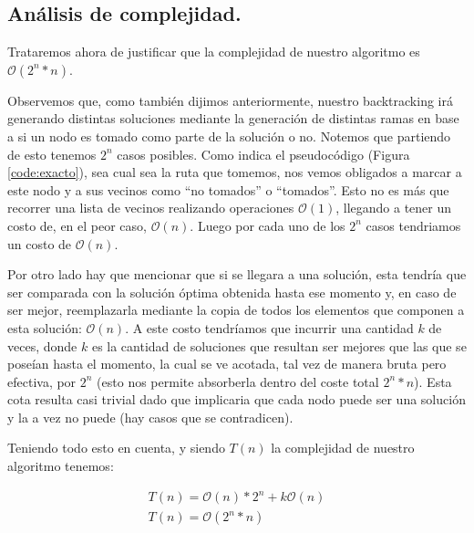 \vspace*{0.6cm}


\subsection{Análisis de complejidad.}

\vspace*{0.3cm}

Trataremos ahora de justificar que la complejidad de nuestro algoritmo es $\mathcal{O}(2^n * n)$.

Observemos que, como también dijimos anteriormente, nuestro backtracking irá generando distintas soluciones mediante la generación de distintas ramas en base a si un nodo es tomado como parte de la solución o no. Notemos que partiendo de esto tenemos $2^n$ casos posibles. Como indica el pseudocódigo (Figura \ref{code:exacto}), sea cual sea la ruta que tomemos, nos vemos obligados a marcar a este nodo y a sus vecinos como ``no tomados'' o ``tomados''. Esto no es más que recorrer una lista de vecinos realizando operaciones $\mathcal{O}(1)$, llegando a tener un costo de, en el peor caso, $\mathcal{O}(n)$. Luego por cada uno de los $2^n$ casos tendriamos un costo de $\mathcal{O}(n)$.

Por otro lado hay que mencionar que si se llegara a una solución, esta tendría que ser comparada con la solución óptima obtenida hasta ese momento y, en caso de ser mejor, reemplazarla mediante la copia de todos los elementos que componen a esta solución: $\mathcal{O}(n)$. A este costo tendríamos que incurrir una cantidad $k$ de veces, donde $k$ es la cantidad de soluciones que resultan ser mejores que las que se poseían hasta el momento, la cual se ve acotada, tal vez de manera bruta pero efectiva, por $2^n$ (esto nos permite absorberla dentro del coste total $2^n*n$). Esta cota resulta casi trivial dado que implicaria que cada nodo puede ser una solución y la a vez no puede (hay casos que se contradicen).

Teniendo todo esto en cuenta, y siendo $T(n)$ la complejidad de nuestro algoritmo tenemos:

\begin{equation*}
\begin{array}{l}
T(n) = \mathcal{O}(n)*2^n + k\mathcal{O}(n)\\
T(n) = \mathcal{O}(2^n *n)
\end{array}
\end{equation*}





